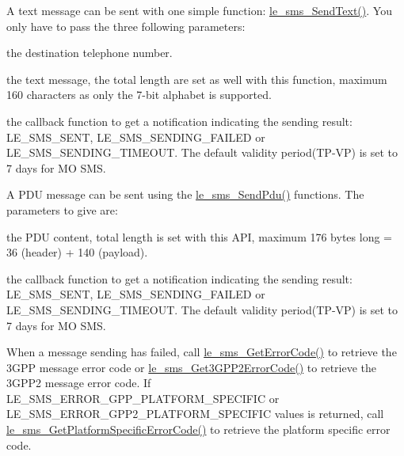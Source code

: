 A text message can be sent with one simple function\+: \hyperlink{le__sms__interface_8h_a275932e7f318db06cd1d1cbc8e3f573f}{le\+\_\+sms\+\_\+\+Send\+Text()}. You only have to pass the three following parameters\+:
\begin{DoxyItemize}
\item the destination telephone number.
\item the text message, the total length are set as well with this function, maximum 160 characters as only the 7-\/bit alphabet is supported.
\item the callback function to get a notification indicating the sending result\+: L\+E\+\_\+\+S\+M\+S\+\_\+\+S\+E\+NT, L\+E\+\_\+\+S\+M\+S\+\_\+\+S\+E\+N\+D\+I\+N\+G\+\_\+\+F\+A\+I\+L\+ED or L\+E\+\_\+\+S\+M\+S\+\_\+\+S\+E\+N\+D\+I\+N\+G\+\_\+\+T\+I\+M\+E\+O\+UT. The default validity period(T\+P-\/\+VP) is set to 7 days for MO S\+MS.
\end{DoxyItemize}

A P\+DU message can be sent using the \hyperlink{le__sms__interface_8h_a6c45951342396e9c4bc0e995b4e70784}{le\+\_\+sms\+\_\+\+Send\+Pdu()} functions. The parameters to give are\+:
\begin{DoxyItemize}
\item the P\+DU content, total length is set with this A\+PI, maximum 176 bytes long = 36 (header) + 140 (payload).
\item the callback function to get a notification indicating the sending result\+: L\+E\+\_\+\+S\+M\+S\+\_\+\+S\+E\+NT, L\+E\+\_\+\+S\+M\+S\+\_\+\+S\+E\+N\+D\+I\+N\+G\+\_\+\+F\+A\+I\+L\+ED or L\+E\+\_\+\+S\+M\+S\+\_\+\+S\+E\+N\+D\+I\+N\+G\+\_\+\+T\+I\+M\+E\+O\+UT. The default validity period(T\+P-\/\+VP) is set to 7 days for MO S\+MS.
\end{DoxyItemize}

When a message sending has failed, call \hyperlink{le__sms__interface_8h_a9ee511af99c91383344debf532fae1ae}{le\+\_\+sms\+\_\+\+Get\+Error\+Code()} to retrieve the 3\+G\+PP message error code or \hyperlink{le__sms__interface_8h_a46afe91bbded617ad444ea29a9dd910a}{le\+\_\+sms\+\_\+\+Get3\+G\+P\+P2\+Error\+Code()} to retrieve the 3\+G\+P\+P2 message error code. If L\+E\+\_\+\+S\+M\+S\+\_\+\+E\+R\+R\+O\+R\+\_\+G\+P\+P\+\_\+\+P\+L\+A\+T\+F\+O\+R\+M\+\_\+\+S\+P\+E\+C\+I\+F\+IC or L\+E\+\_\+\+S\+M\+S\+\_\+\+E\+R\+R\+O\+R\+\_\+G\+P\+P2\+\_\+\+P\+L\+A\+T\+F\+O\+R\+M\+\_\+\+S\+P\+E\+C\+I\+F\+IC values is returned, call \hyperlink{le__sms__interface_8h_a9cfbc2131df38f99272a71bf05cb1254}{le\+\_\+sms\+\_\+\+Get\+Platform\+Specific\+Error\+Code()} to retrieve the platform specific error code.

